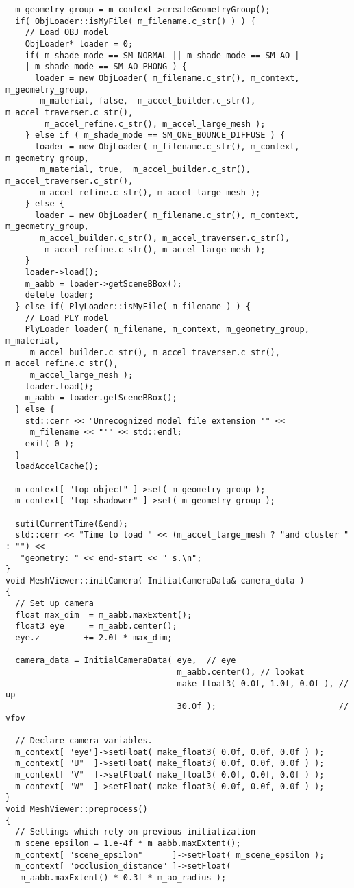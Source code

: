 \begin{verbatim}
  m_geometry_group = m_context->createGeometryGroup();
  if( ObjLoader::isMyFile( m_filename.c_str() ) ) {
    // Load OBJ model 
    ObjLoader* loader = 0;
    if( m_shade_mode == SM_NORMAL || m_shade_mode == SM_AO |
    | m_shade_mode == SM_AO_PHONG ) {
      loader = new ObjLoader( m_filename.c_str(), m_context, m_geometry_group,
       m_material, false,  m_accel_builder.c_str(), m_accel_traverser.c_str(),
        m_accel_refine.c_str(), m_accel_large_mesh );
    } else if ( m_shade_mode == SM_ONE_BOUNCE_DIFFUSE ) {
      loader = new ObjLoader( m_filename.c_str(), m_context, m_geometry_group,
       m_material, true,  m_accel_builder.c_str(), m_accel_traverser.c_str(), 
       m_accel_refine.c_str(), m_accel_large_mesh );
    } else {
      loader = new ObjLoader( m_filename.c_str(), m_context, m_geometry_group,
       m_accel_builder.c_str(), m_accel_traverser.c_str(),
        m_accel_refine.c_str(), m_accel_large_mesh );
    }
    loader->load();
    m_aabb = loader->getSceneBBox();
    delete loader;
  } else if( PlyLoader::isMyFile( m_filename ) ) {
    // Load PLY model 
    PlyLoader loader( m_filename, m_context, m_geometry_group, m_material,
     m_accel_builder.c_str(), m_accel_traverser.c_str(), m_accel_refine.c_str(), 
     m_accel_large_mesh );
    loader.load();
    m_aabb = loader.getSceneBBox();
  } else {
    std::cerr << "Unrecognized model file extension '" <<
     m_filename << "'" << std::endl;
    exit( 0 );
  }
  loadAccelCache();
 
  m_context[ "top_object" ]->set( m_geometry_group );
  m_context[ "top_shadower" ]->set( m_geometry_group );

  sutilCurrentTime(&end);
  std::cerr << "Time to load " << (m_accel_large_mesh ? "and cluster " : "") <<
   "geometry: " << end-start << " s.\n";
}
void MeshViewer::initCamera( InitialCameraData& camera_data )
{
  // Set up camera
  float max_dim  = m_aabb.maxExtent();
  float3 eye     = m_aabb.center();
  eye.z         += 2.0f * max_dim;

  camera_data = InitialCameraData( eye,  // eye
                                   m_aabb.center(), // lookat
                                   make_float3( 0.0f, 1.0f, 0.0f ), // up
                                   30.0f );                         // vfov

  // Declare camera variables. 
  m_context[ "eye"]->setFloat( make_float3( 0.0f, 0.0f, 0.0f ) );
  m_context[ "U"  ]->setFloat( make_float3( 0.0f, 0.0f, 0.0f ) );
  m_context[ "V"  ]->setFloat( make_float3( 0.0f, 0.0f, 0.0f ) );
  m_context[ "W"  ]->setFloat( make_float3( 0.0f, 0.0f, 0.0f ) );
}
void MeshViewer::preprocess()
{
  // Settings which rely on previous initialization
  m_scene_epsilon = 1.e-4f * m_aabb.maxExtent();
  m_context[ "scene_epsilon"      ]->setFloat( m_scene_epsilon );
  m_context[ "occlusion_distance" ]->setFloat(
   m_aabb.maxExtent() * 0.3f * m_ao_radius );


\end{verbatim}

